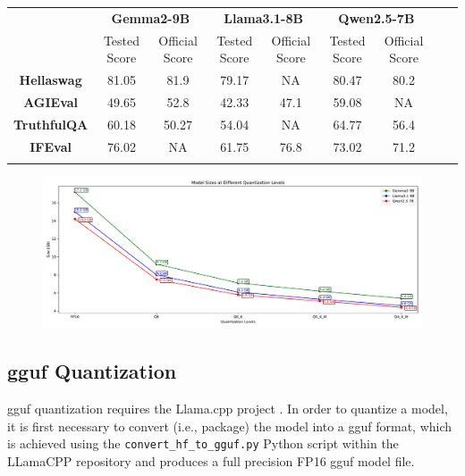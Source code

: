 \documentclass{ifacconf}
\begin{document}
	\begin{strip}
		\begin{minipage}{\textwidth}
			\centering
			\begin{tabular}{|c|c|c|c|c|c|c|c|c|}
				\hline
				\multirow{2}{*}{\textbf{}} &
				\multicolumn{2}{c|}{\textbf{Gemma2-9B}} & \multicolumn{2}{c|}{\textbf{Llama3.1-8B}} & \multicolumn{2}{c|}{\textbf{Qwen2.5-7B}} \\
				\cline{2-7}& 
				Tested Score & Official Score &
				Tested Score & Official Score & 
				Tested Score & Official Score \\
				\hline
				\textbf{Hellaswag} & 81.05 & 81.9 & 79.17 & NA & 80.47 & 80.2 \\
				\hline
				\textbf{AGIEval} & 49.65 & 52.8 & 42.33 & 47.1 & 59.08  & NA \\
				\hline
				\textbf{TruthfulQA} & 60.18 & 50.27 & 54.04 & NA & 64.77 & 56.4 \\
				\hline
				\textbf{IFEval} & 76.02 & NA & 61.75 & 76.8 & 73.02 & 71.2 \\
				\hline
				\label{baseline-scores}
			\end{tabular}
			
			\begin{figure}[H]
				\centering
				\includegraphics[width=\textwidth]{images/gguf-sizes.pdf}
				\label{fig:gguf-sizes}
			\end{figure}
		\end{minipage}
	\end{strip}
	
	\subsection{\gls{gguf} Quantization}
	\gls{gguf} quantization requires the Llama.cpp project \cite{llamacpp}. In order to quantize a model, it is first necessary to convert (i.e., package) the model into a \gls{gguf} format, which is achieved using the \verb|convert_hf_to_gguf.py| Python script within the LLamaCPP repository and produces a full precision FP16 \gls{gguf} model file.
	
\end{document}
